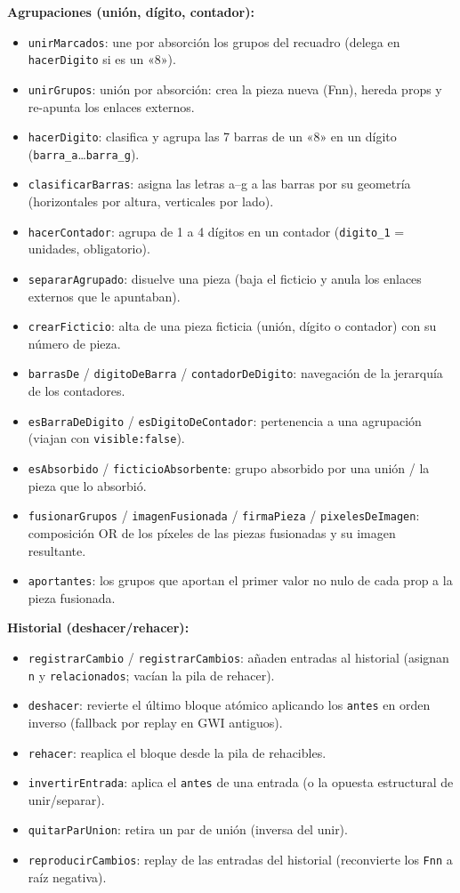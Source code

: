 \documentclass[../main.tex]{subfiles}
\begin{document}
	\textbf{Agrupaciones (unión, dígito, contador):}
	\begin{itemize}
		\item \texttt{unirMarcados}: une por absorción los grupos del
		recuadro (delega en \texttt{hacerDigito} si es un «8»).
		\item \texttt{unirGrupos}: unión por absorción: crea la pieza nueva
		(Fnn), hereda props y re-apunta los enlaces externos.
		\item \texttt{hacerDigito}: clasifica y agrupa las 7 barras de un
		«8» en un dígito (\texttt{barra\_a}\ldots\texttt{barra\_g}).
		\item \texttt{clasificarBarras}: asigna las letras a--g a las barras
		por su geometría (horizontales por altura, verticales por lado).
		\item \texttt{hacerContador}: agrupa de 1 a 4 dígitos en un
		contador (\texttt{digito\_1} = unidades, obligatorio).
		\item \texttt{separarAgrupado}: disuelve una pieza (baja el
		ficticio y anula los enlaces externos que le apuntaban).
		\item \texttt{crearFicticio}: alta de una pieza ficticia (unión,
		dígito o contador) con su número de pieza.
		\item \texttt{barrasDe} / \texttt{digitoDeBarra} /
		\texttt{contadorDeDigito}: navegación de la jerarquía de los
		contadores.
		\item \texttt{esBarraDeDigito} / \texttt{esDigitoDeContador}:
		pertenencia a una agrupación (viajan con \texttt{visible:false}).
		\item \texttt{esAbsorbido} / \texttt{ficticioAbsorbente}: grupo
		absorbido por una unión / la pieza que lo absorbió.
		\item \texttt{fusionarGrupos} / \texttt{imagenFusionada} /
		\texttt{firmaPieza} / \texttt{pixelesDeImagen}: composición OR de
		los píxeles de las piezas fusionadas y su imagen resultante.
		\item \texttt{aportantes}: los grupos que aportan el primer valor no
		nulo de cada prop a la pieza fusionada.
	\end{itemize}
	
	\textbf{Historial (deshacer/rehacer):}
	\begin{itemize}
		\item \texttt{registrarCambio} / \texttt{registrarCambios}: añaden
		entradas al historial (asignan \texttt{n} y \texttt{relacionados};
		vacían la pila de rehacer).
		\item \texttt{deshacer}: revierte el último bloque atómico aplicando
		los \texttt{antes} en orden inverso (fallback por replay en GWI
		antiguos).
		\item \texttt{rehacer}: reaplica el bloque desde la pila de
		rehacibles.
		\item \texttt{invertirEntrada}: aplica el \texttt{antes} de una
		entrada (o la opuesta estructural de unir/separar).
		\item \texttt{quitarParUnion}: retira un par de unión (inversa del
		unir).
		\item \texttt{reproducirCambios}: replay de las entradas del
		historial (reconvierte los \texttt{Fnn} a raíz negativa).
	\end{itemize}
	
\end{document}
